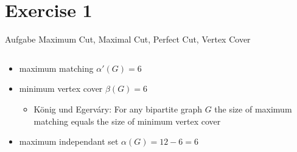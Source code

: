 
\section{Exercise 1}

\setcounter{exercise}{1}

\begin{frame}[allowframebreaks]{Aufgabe \thesection}{Maximum Cut, Maximal Cut, Perfect Cut, Vertex Cover}
  \begin{solution}
  \end{solution}
  \begin{solution}
  \end{solution}
  \begin{solution}
  \end{solution}
  \begin{solutionnoinc}
    \begin{columns}
      \begin{column}{0.5\textwidth}
      \end{column}
      \begin{column}{0.5\textwidth}
      \end{column}
    \end{columns}
  \end{solutionnoinc}
  \begin{solution}
  \end{solution}
  \begin{solution}
    \begin{columns}
      \begin{column}{0.5\textwidth}
        \begin{itemize}
          \item maximum matching $\alpha'(G) = 6$
          \item minimum vertex cover $\beta(G) = 6$
          \begin{itemize}
            \item \alert{König und Egerváry:} For any bipartite graph $G$ the size of maximum matching equals the size of minimum vertex cover
          \end{itemize}
          \item maximum independant set $\alpha(G) = 12 - 6 = 6$ 

\end{itemize}
\end{column}
\end{columns}
\end{solution}
\end{frame}
